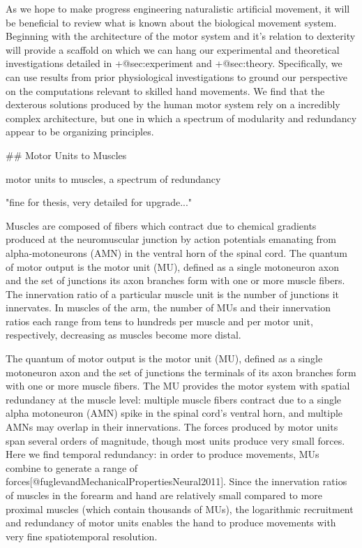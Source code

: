 \documentclass[../main.tex]{subfiles}
\begin{document}
 As we hope to make progress engineering naturalistic artificial movement, it will be beneficial to review what is known about the biological movement system. Beginning with the architecture of the motor system and it's relation to dexterity will provide a scaffold on which we can hang our experimental and theoretical investigations detailed in {+@sec:experiment} and {+@sec:theory}. Specifically, we can use results from prior physiological investigations to ground our perspective on the computations relevant to skilled hand movements. We find that the dexterous solutions produced by the human motor system rely on a incredibly complex architecture, but one in which a spectrum of modularity and redundancy appear to be organizing principles. 

## Motor Units to Muscles

 motor units to muscles, a spectrum of redundancy 

 "fine for thesis, very detailed for upgrade..." 

 Muscles are composed of fibers which contract due to chemical gradients produced at the neuromuscular junction by action potentials emanating from alpha-motoneurons (AMN) in the ventral horn of the spinal cord. The quantum of motor output is the motor unit (MU), defined as a single motoneuron axon and the set of junctions its axon branches form with one or more muscle fibers. The innervation ratio of a particular muscle unit is the number of junctions it innervates. In muscles of the arm, the number of MUs and their innervation ratios each range from tens to hundreds per muscle and per motor unit, respectively, decreasing as muscles become more distal. 

The quantum of motor output is the motor unit (MU), defined as a single motoneuron axon and the set of junctions the terminals of its axon branches form with one or more muscle fibers. The MU provides the motor system with spatial redundancy at the muscle level: multiple muscle fibers contract due to a single alpha motoneuron (AMN) spike in the spinal cord's ventral horn, and multiple AMNs may overlap in their innervations. The forces produced by motor units span several orders of magnitude, though most units produce very small forces. Here we find temporal redundancy: in order to produce movements, MUs combine to generate a range of forces[@fuglevandMechanicalPropertiesNeural2011]. Since the innervation ratios of muscles in the forearm and hand are relatively small compared to more proximal muscles (which contain thousands of MUs), the logarithmic recruitment and redundancy of motor units enables the hand to produce movements with very fine spatiotemporal resolution.
\end{document}
